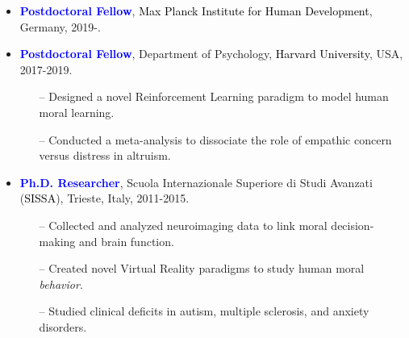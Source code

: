 \documentclass[10pt]{article}
\begin{document}
	\header


	\begin{itemize}

    \itemsep-0.1em
	\item \textbf{\textcolor{blue}{Postdoctoral Fellow}}, \textcolor{black}{Max Planck Institute for Human Development}, Germany, 2019-.
	\miniskip
	
	\item \textbf{\textcolor{blue}{Postdoctoral Fellow}}, Department of Psychology, \textcolor{black}{Harvard University}, USA, 2017-2019.
	\vspace*{-0.09in}
	
	\begin{itemize}
	\itemsep-0.1em 
	\item[--] Designed a novel Reinforcement Learning paradigm to model human moral learning.	
	\item[--] Conducted a meta-analysis to dissociate the role of empathic concern versus distress in altruism.
	\end{itemize}
	\vspace*{-0.09in}

	\item \textbf{\textcolor{blue}{Ph.D. Researcher}}, Scuola Internazionale Superiore di Studi Avanzati (\textcolor{black}{SISSA}), Trieste, Italy, 2011-2015.
	\vspace*{-0.09in}

	\begin{itemize}
	\itemsep-0.1em 
	\item[--] Collected and analyzed neuroimaging data to link moral decision-making and brain function.
	\item[--] Created novel Virtual Reality paradigms to study human moral \textit{behavior}.
	\item[--] Studied clinical deficits in autism, multiple sclerosis, and anxiety disorders.
	\end{itemize}
    \vspace*{-0.09in}
    
	\end{itemize}    
    
	
\end{document}

